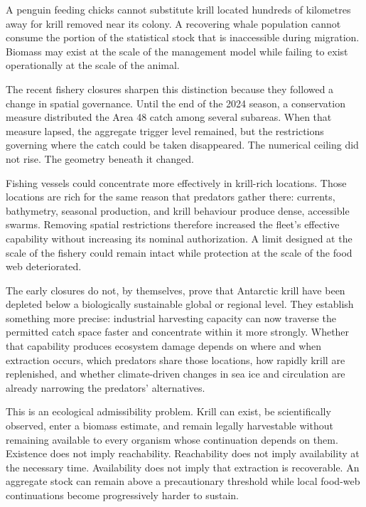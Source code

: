 \documentclass[11pt,oneside]{book}
\begin{document}
A penguin feeding chicks cannot substitute krill located hundreds of kilometres away for krill removed near its colony. A recovering whale population cannot consume the portion of the statistical stock that is inaccessible during migration. Biomass may exist at the scale of the management model while failing to exist operationally at the scale of the animal.

The recent fishery closures sharpen this distinction because they followed a change in spatial governance. Until the end of the 2024 season, a conservation measure distributed the Area 48 catch among several subareas. When that measure lapsed, the aggregate trigger level remained, but the restrictions governing where the catch could be taken disappeared. The numerical ceiling did not rise. The geometry beneath it changed.

Fishing vessels could concentrate more effectively in krill-rich locations. Those locations are rich for the same reason that predators gather there: currents, bathymetry, seasonal production, and krill behaviour produce dense, accessible swarms. Removing spatial restrictions therefore increased the fleet's effective capability without increasing its nominal authorization. A limit designed at the scale of the fishery could remain intact while protection at the scale of the food web deteriorated.

The early closures do not, by themselves, prove that Antarctic krill have been depleted below a biologically sustainable global or regional level. They establish something more precise: industrial harvesting capacity can now traverse the permitted catch space faster and concentrate within it more strongly. Whether that capability produces ecosystem damage depends on where and when extraction occurs, which predators share those locations, how rapidly krill are replenished, and whether climate-driven changes in sea ice and circulation are already narrowing the predators' alternatives.

This is an ecological admissibility problem. Krill can exist, be scientifically observed, enter a biomass estimate, and remain legally harvestable without remaining available to every organism whose continuation depends on them. Existence does not imply reachability. Reachability does not imply availability at the necessary time. Availability does not imply that extraction is recoverable. An aggregate stock can remain above a precautionary threshold while local food-web continuations become progressively harder to sustain.
\end{document}
